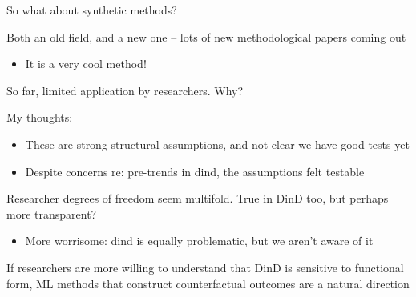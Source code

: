 \documentclass[notes,11pt, aspectratio=169]{beamer}
\newenvironment{wideitemize}{\itemize\addtolength{\itemsep}{10pt}}{\enditemize}
\begin{document}
\begin{frame}{So what about synthetic methods?}
  \begin{wideitemize}
  \item Both an old field, and a new one -- lots of new methodological papers coming out 
    \begin{itemize}
    \item It is a very cool method!
    \end{itemize}
  \item So far, limited application by researchers. Why?
  \item  My thoughts:
    \begin{itemize}
    \item These are strong structural assumptions, and not clear we
      have good tests yet
    \item Despite concerns re: pre-trends in dind, the assumptions
      felt testable
    \end{itemize}
  \item Researcher degrees of freedom seem multifold. True in DinD
    too, but perhaps more transparent?
    \begin{itemize}
    \item More worrisome: dind is equally problematic, but we aren't
      aware of it
    \end{itemize}
  \item If researchers are more willing to understand that DinD is
    sensitive to functional form, ML methods that construct
    counterfactual outcomes are a natural direction
  \end{wideitemize}
\end{frame}
\end{document}
